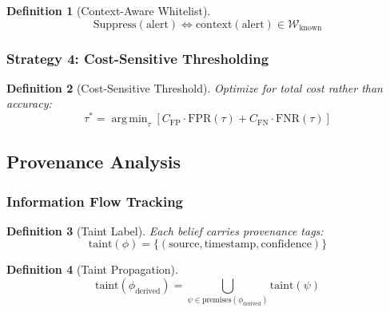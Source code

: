 \documentclass[
]{article}
\newtheorem{definition}{Definition}[section]
\DeclareMathOperator*{\argmin}{arg\,min}
\begin{document}
\begin{definition}[Context-Aware Whitelist]
\label{def:context-whitelist}
\begin{equation}
\label{eq:whitelist-suppress}
\text{Suppress}(\text{alert}) \iff \text{context}(\text{alert}) \in \mathcal{W}_{\text{known}}
\end{equation}
\end{definition}

\subsubsection{Strategy 4: Cost-Sensitive
Thresholding}\label{strategy-4-cost-sensitive-thresholding}

\begin{definition}[Cost-Sensitive Threshold]
\label{def:cost-threshold}
Optimize for total cost rather than accuracy:
\begin{equation}
\label{eq:cost-threshold}
\tau^* = \argmin_\tau \left[ C_{\text{FP}} \cdot \text{FPR}(\tau) + C_{\text{FN}} \cdot \text{FNR}(\tau) \right]
\end{equation}
\end{definition}

\subsection{Provenance Analysis}\label{sec:provenance}

\subsubsection{Information Flow
Tracking}\label{information-flow-tracking}

\begin{definition}[Taint Label]
\label{def:taint-label}
Each belief carries provenance tags:
\begin{equation}
\label{eq:taint-label}
\text{taint}(\phi) = \{(\text{source}, \text{timestamp}, \text{confidence})\}
\end{equation}
\end{definition}

\begin{definition}[Taint Propagation]
\label{def:taint-propagation}
\begin{equation}
\label{eq:taint-propagation}
\text{taint}(\phi_{\text{derived}}) = \bigcup_{\psi \in \text{premises}(\phi_{\text{derived}})} \text{taint}(\psi)
\end{equation}
\end{definition}
\end{document}
